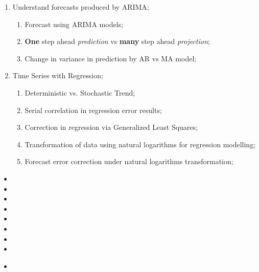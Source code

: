 \documentclass[12pt, titlepage, french]{report}
\begin{document}
\begin{outcomes}
\begin{enumerate}
\tcbline
	\item	Understand forecasts produced by ARIMA;
	\begin{knowledge}
	\begin{enumerate}
	\item	Forecast using ARIMA models;
	\item	\textbf{One} step ahead \textit{prediction} vs \textbf{many} step ahead \textit{projection};
	\item	Change in variance in prediction by AR vs MA model;
	\end{enumerate}
	\end{knowledge}
\tcbline
	\item	Time Series with Regression;
	\begin{knowledge}
	\begin{enumerate}
	\item	Deterministic vs. Stochastic Trend;
	\item	Serial correlation in regression error results;
	\item	Correction in regression via Generalized Least Squares;
	\item	Transformation of data using natural logarithms for regression modelling;
	\item	Forecast error correction under natural logarithms transformation;
	\end{enumerate}
	\end{knowledge}
\end{enumerate}
\end{outcomes}

\begin{ASM_chapter}
\begin{itemize}
	\item[]	
	\item[]	
	\item[]	
	\item[]	
	\item[]	
	\item[]	
	\item[]	
	\item[]	
\end{itemize}
\end{ASM_chapter}

\begin{YTB_vids}
\begin{itemize}
	\item	
\end{itemize}
\end{YTB_vids}
\end{document}
